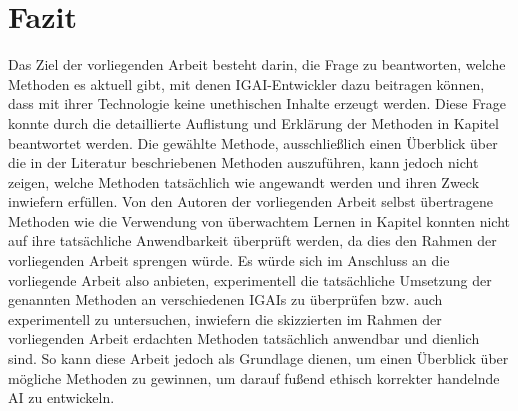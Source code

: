 \documentclass[12pt]{report}
\begin{document}
\chapter{Fazit}
Das Ziel der vorliegenden Arbeit besteht darin, die Frage zu beantworten, welche Methoden es aktuell gibt, mit denen IGAI-Entwickler dazu beitragen können, dass mit ihrer Technologie keine unethischen Inhalte erzeugt werden. Diese Frage konnte durch die detaillierte Auflistung und Erklärung der Methoden in Kapitel  beantwortet werden. Die gewählte Methode, ausschließlich einen Überblick über die in der Literatur beschriebenen Methoden auszuführen, kann jedoch nicht zeigen, welche Methoden tatsächlich wie angewandt werden und ihren Zweck inwiefern erfüllen. Von den Autoren der vorliegenden Arbeit selbst übertragene Methoden wie die Verwendung von überwachtem Lernen in Kapitel  konnten nicht auf ihre tatsächliche Anwendbarkeit überprüft werden, da dies den Rahmen der vorliegenden Arbeit sprengen würde. Es würde sich im Anschluss an die vorliegende Arbeit also anbieten, experimentell die tatsächliche Umsetzung der genannten Methoden an verschiedenen IGAIs zu überprüfen bzw. auch experimentell zu untersuchen, inwiefern die skizzierten im Rahmen der vorliegenden Arbeit erdachten Methoden tatsächlich anwendbar und dienlich sind.
So kann diese Arbeit jedoch als Grundlage dienen, um einen Überblick über mögliche Methoden zu gewinnen, um darauf fußend ethisch korrekter handelnde AI zu entwickeln.

\end{document}
